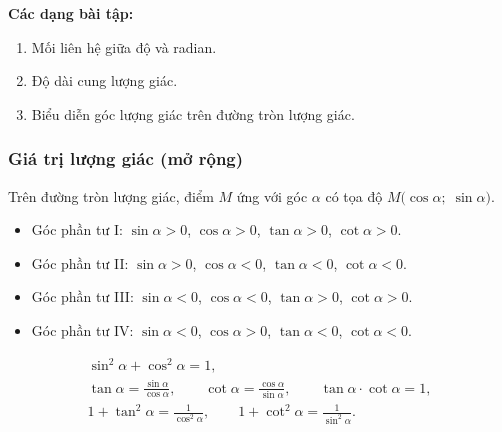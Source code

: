 \documentclass[12pt,a4paper]{article}
\begin{document}
\medskip\noindent\textbf{Các dạng bài tập:}
\begin{enumerate}[label=\textbf{Dạng \arabic*:}, leftmargin=*, align=left]
  \item Mối liên hệ giữa độ và radian.
  \item Độ dài cung lượng giác.
  \item Biểu diễn góc lượng giác trên đường tròn lượng giác.
\end{enumerate}

\subsubsection{Giá trị lượng giác (mở rộng)}

\begin{dinhnghia}
  Trên đường tròn lượng giác, điểm $M$ ứng với góc $\alpha$ có tọa độ
  $M\bigl(\cos\alpha;\;\sin\alpha\bigr)$.
\end{dinhnghia}

\begin{tinhchat}[title={Dấu của giá trị lượng giác theo góc phần tư}]
  \begin{itemize}
    \item Góc phần tư I: $\sin\alpha > 0$, \;$\cos\alpha > 0$, \;$\tan\alpha > 0$, \;$\cot\alpha > 0$.
    \item Góc phần tư II: $\sin\alpha > 0$, \;$\cos\alpha < 0$, \;$\tan\alpha < 0$, \;$\cot\alpha < 0$.
    \item Góc phần tư III: $\sin\alpha < 0$, \;$\cos\alpha < 0$, \;$\tan\alpha > 0$, \;$\cot\alpha > 0$.
    \item Góc phần tư IV: $\sin\alpha < 0$, \;$\cos\alpha > 0$, \;$\tan\alpha < 0$, \;$\cot\alpha < 0$.
  \end{itemize}
\end{tinhchat}

\begin{congthuc}[title={Các hệ thức lượng giác cơ bản}]
  \begin{gather}
    \sin^2\alpha + \cos^2\alpha = 1, \\[4pt]
    \tan\alpha = \frac{\sin\alpha}{\cos\alpha},\qquad
    \cot\alpha = \frac{\cos\alpha}{\sin\alpha},\qquad
    \tan\alpha \cdot \cot\alpha = 1, \\[4pt]
    1 + \tan^2\alpha = \frac{1}{\cos^2\alpha},\qquad
    1 + \cot^2\alpha = \frac{1}{\sin^2\alpha}.
  \end{gather}
\end{congthuc}
\end{document}
